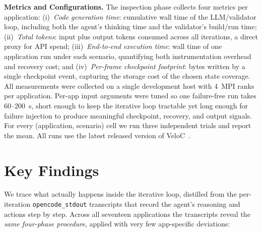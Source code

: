 \documentclass[conference]{IEEEtran}
\begin{document}
\medskip
\noindent\textbf{Metrics and Configurations.}
The inspection phase collects four metrics per application:
(i)~\emph{Code generation time}: cumulative wall time of the LLM/validator loop, including both the agent's thinking time and the validator's build/run time;
(ii)~\emph{Total tokens}: input plus output tokens consumed across all iterations, a direct proxy for API spend;
(iii)~\emph{End-to-end execution time}: wall time of one application run under each scenario, quantifying both instrumentation overhead and recovery cost; and
(iv)~\emph{Per-frame checkpoint footprint}: bytes written by a single checkpoint event, capturing the storage cost of the chosen state coverage.
All measurements were collected on a single development host with 4~MPI ranks per application. Per-app input arguments were tuned so one failure-free run takes 60--200~s, short enough to keep the iterative loop tractable yet long enough for failure injection to produce meaningful checkpoint, recovery, and output signals. For every (application, scenario) cell we run three independent trials and report the mean. All runs use the latest released version of VeloC~\cite{veloc}.


\section{Key Findings}
\label{sec:findings}



We trace what actually happens inside the iterative loop, distilled from the per-iteration \texttt{opencode\_stdout} transcripts that record the agent's reasoning and actions step by step. Across all seventeen applications the transcripts reveal the \emph{same four-phase procedure}, applied with very few app-specific deviations:
\end{document}
